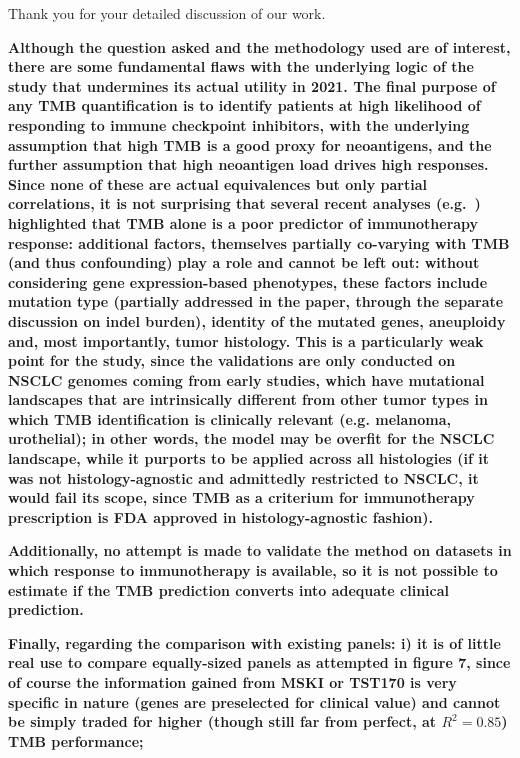 \documentclass[12pt]{article}
\begin{document}
Thank you for your detailed discussion of our work.  

\textbf{Although the question asked and the methodology used are of interest, there are some fundamental flaws with the underlying logic of the study that undermines its actual utility in 2021. The final purpose of any TMB quantification is to identify patients at high likelihood of responding to immune checkpoint inhibitors, with the underlying assumption that high TMB is a good proxy for neoantigens, and the further assumption that high neoantigen load drives high responses. Since none of these are actual equivalences but only partial correlations, it is not surprising that several recent analyses (e.g.~\citet{litchfield2021meta}) highlighted that TMB alone is a poor predictor of immunotherapy response: additional factors, themselves partially co-varying with TMB (and thus confounding) play a role and cannot be left out: without considering gene expression-based phenotypes, these factors include mutation type (partially addressed in the paper, through the separate discussion on indel
burden), identity of the mutated genes, aneuploidy and, most importantly, tumor histology. This is a particularly weak point for the study, since the validations are only conducted on NSCLC genomes coming from early studies, which have mutational landscapes that are intrinsically different from other tumor types in which TMB identification is clinically relevant (e.g. melanoma, urothelial); in other words, the model may be overfit for the NSCLC landscape, while it purports to be applied across all histologies (if it was not histology-agnostic and admittedly restricted to NSCLC, it would fail its scope, since TMB as a criterium for immunotherapy prescription is FDA approved in histology-agnostic fashion).}



\textbf{Additionally, no attempt is made to validate the method on datasets in which response to immunotherapy is available, so it is not possible to estimate if the TMB prediction converts into adequate clinical prediction.}


\textbf{Finally, regarding the comparison with existing panels: 
i) it is of little real use to compare equally-sized panels as attempted in figure 7, since of course the information gained from MSKI or TST170 is very specific in nature (genes are preselected for clinical value) and cannot be simply traded for higher (though still far from perfect, at $R^2=0.85$) TMB performance;}
\end{document}

